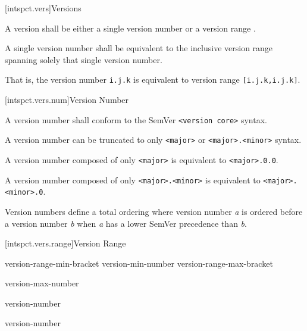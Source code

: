 [intspct.vers]{Versions}

\pnum
A version shall be either a single version number  or a
version range .

\pnum
A single version number shall be equivalent to the inclusive version range
spanning solely that single version number.

\begin{note}
That is, the version number \verb|i.j.k| is equivalent to version range
\verb|[i.j.k,i.j.k]|.
\end{note}

[intspct.vers.num]{Version Number}

\pnum
A version number shall conform to the SemVer \verb|<version core>| syntax.

\pnum
A version number can be truncated to only \verb|<major>| or
\verb|<major>.<minor>| syntax.

\pnum
A version number composed of only \verb|<major>| is equivalent to
\verb|<major>.0.0|.

\pnum
A version number composed of only \verb|<major>.<minor>| is equivalent to
\verb|<major>.<minor>.0|.

\pnum
Version numbers define a total ordering where version number \emph{a} is
ordered before a version number \emph{b} when \emph{a} has a lower SemVer
precedence than \emph{b}.

[intspct.vers.range]{Version Range}

\pnum
\begin{ncbnf}

\br
	version-range-min-bracket
	version-min-number 
	version-range-max-bracket

\br
	  version-max-number

\br
	version-number

\br
	version-number

\br
	 
	 

\br
	 
	 

\end{ncbnf}

